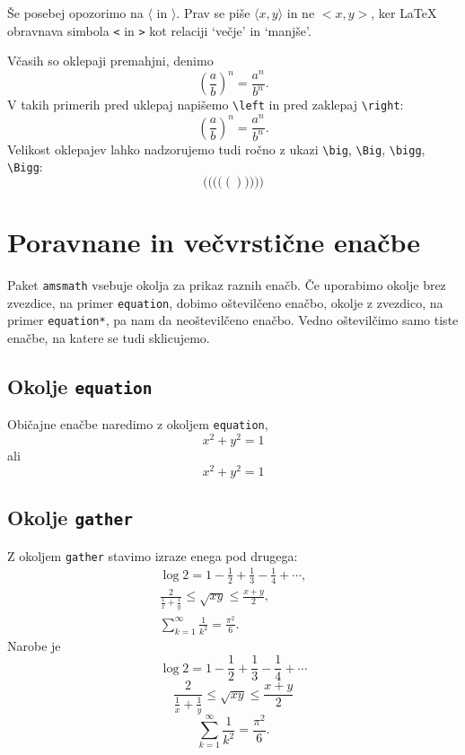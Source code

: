 \documentclass{amsart}
\begin{document}
Še posebej opozorimo na $\langle$ in $\rangle$. Prav se piše $\langle x, y\rangle$ in ne
$<x, y>$, ker {\LaTeX} obravnava simbola \texttt{<} in \texttt{>} kot relaciji `večje' in
`manjše'.

Včasih so oklepaji premahjni, denimo
%
\[
  (\frac{a}{b})^n = \frac{a^n}{b^n}.
\]
%
V takih primerih pred uklepaj napišemo \verb|\left| in pred zaklepaj \verb|\right|:
%
\[
  \left(\frac{a}{b}\right)^n = \frac{a^n}{b^n}.
\]
%
Velikost oklepajev lahko nadzorujemo tudi ročno z ukazi \verb|\big|, \verb|\Big|,
\verb|\bigg|, \verb|\Bigg|:
%
\[
  \Bigg( \bigg( \Big( \big( ( ) \big) \Big) \bigg) \Bigg)
\]


\section{Poravnane in večvrstične enačbe}
\label{sec:enacbe}

Paket \texttt{amsmath} vsebuje okolja za prikaz raznih enačb. Če uporabimo okolje brez
zvezdice, na primer \texttt{equation}, dobimo oštevilčeno enačbo, okolje z zvezdico, na
primer \texttt{equation*}, pa nam da neoštevilčeno enačbo. Vedno oštevilčimo samo tiste
enačbe, na katere se tudi sklicujemo.

\subsection{Okolje \texttt{equation}}

Običajne enačbe naredimo z okoljem \texttt{equation},
%
\begin{equation*}
  x^2 + y^2 = 1
\end{equation*}
%
ali
%
\begin{equation}
  \label{eq:1}
  x^2 + y^2 = 1
\end{equation}

\subsection{Okolje \texttt{gather}}

Z okoljem \texttt{gather} stavimo izraze enega pod drugega:
%
\begin{gather*}
  \log 2 = 1 - \frac{1}{2} + \frac{1}{3} - \frac{1}{4} + \cdots, \\
  \frac{2}{\frac{1}{x} + \frac{1}{y}} \leq \sqrt{x y} \leq \frac{x + y}{2}, \\
  \sum_{k = 1}^\infty \frac{1}{k^2} = \frac{\pi^2}{6}.
\end{gather*}
%
Narobe je
%
\[
  \log 2 = 1 - \frac{1}{2} + \frac{1}{3} - \frac{1}{4} + \cdots
\]
%
\[
  \frac{2}{\frac{1}{x} + \frac{1}{y}} \leq \sqrt{x y} \leq \frac{x + y}{2}
\]
%
\[
  \sum_{k = 1}^\infty \frac{1}{k^2} = \frac{\pi^2}{6}.
\]
\end{document}
